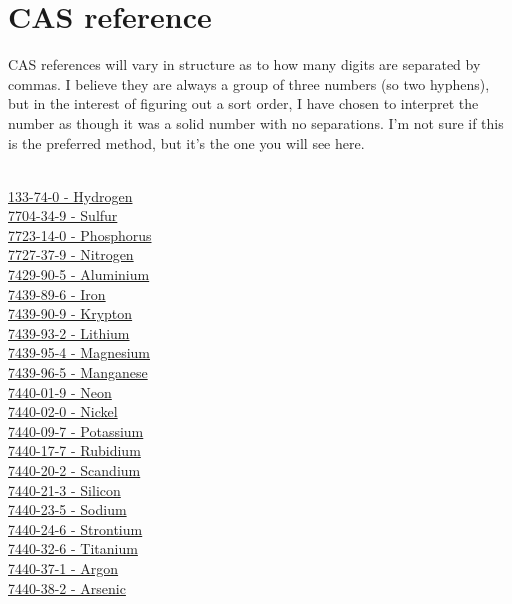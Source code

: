 \documentclass{book}
\begin{document}
\chapter{CAS reference}
CAS references will vary in structure as to how many digits are separated by commas.  I believe they are always a group of three numbers (so two hyphens), but in the interest of figuring out a sort order, I have chosen to interpret the number as though it was a solid number with no separations.  I'm not sure if this is the preferred method, but it's the one you will see here.\\
\\
\begin{multicols}{2}
\noindent
\hyperref[sec:elem-hydrogen]{133-74-0 - Hydrogen}\\
\hyperref[sec:elem-sulfur]{7704-34-9 - Sulfur}\\
\hyperref[sec:elem-phosphorus]{7723-14-0 - Phosphorus}\\
\hyperref[sec:elem-nitrogen]{7727-37-9 - Nitrogen}\\
\hyperref[sec:elem-aluminium]{7429-90-5 - Aluminium}\\
\hyperref[sec:elem-iron]{7439-89-6 - Iron}\\
\hyperref[sec:elem-krypton]{7439-90-9 - Krypton}\\
\hyperref[sec:elem-lithium]{7439-93-2 - Lithium}\\
\hyperref[sec:elem-magnesium]{7439-95-4 - Magnesium}\\
\hyperref[sec:elem-manganese]{7439-96-5 - Manganese}\\
\hyperref[sec:elem-neon]{7440-01-9 - Neon}\\
\hyperref[sec:elem-nickel]{7440-02-0 - Nickel}\\
\hyperref[sec:elem-potassium]{7440-09-7 - Potassium}\\
\hyperref[sec:elem-rubidium]{7440-17-7 - Rubidium}\\
\hyperref[sec:elem-scandium]{7440-20-2 - Scandium}\\
\hyperref[sec:elem-silicon]{7440-21-3 - Silicon}\\
\hyperref[sec:elem-sodium]{7440-23-5 - Sodium}\\
\hyperref[sec:elem-strontium]{7440-24-6 - Strontium}\\
\hyperref[sec:elem-titanium]{7440-32-6 - Titanium}\\
\hyperref[sec:elem-argon]{7440-37-1 - Argon}\\
\hyperref[sec:elem-arsenic]{7440-38-2 - Arsenic}\\

\end{multicols}
\end{document}
